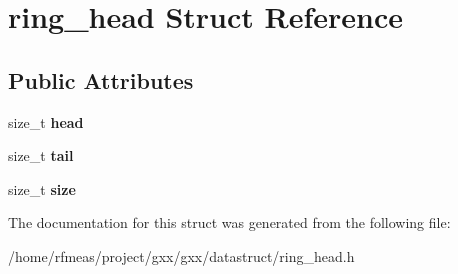 \hypertarget{structring__head}{}\section{ring\+\_\+head Struct Reference}
\label{structring__head}
\subsection*{Public Attributes}
\begin{DoxyCompactItemize}
\item 
size\+\_\+t {\bfseries head}\hypertarget{structring__head_a5915f8ce4d95dde04360def3837fc236}{}\label{structring__head_a5915f8ce4d95dde04360def3837fc236}

\item 
size\+\_\+t {\bfseries tail}\hypertarget{structring__head_ac4c34d3e788115f59ba5c2755e9bfa95}{}\label{structring__head_ac4c34d3e788115f59ba5c2755e9bfa95}

\item 
size\+\_\+t {\bfseries size}\hypertarget{structring__head_a81a577f8227b1512996c846dd5a39287}{}\label{structring__head_a81a577f8227b1512996c846dd5a39287}

\end{DoxyCompactItemize}


The documentation for this struct was generated from the following file\+:\begin{DoxyCompactItemize}
\item 
/home/rfmeas/project/gxx/gxx/datastruct/ring\+\_\+head.\+h\end{DoxyCompactItemize}
